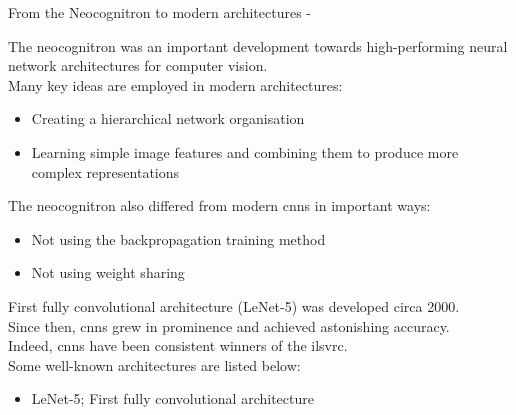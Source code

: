 %
%
%

\begin{frame}[t,allowframebreaks]{From the Neocognitron to modern architectures -}

    The \gls{neocognitron} 
    was an important development towards high-performing neural network
    architectures for computer vision.\\
    \vspace{0.2cm}
    Many key ideas are employed in modern architectures:    
    \begin{itemize}
        \item Creating a hierarchical network organisation
        \item Learning simple image features and combining them to produce more complex representations
    \end{itemize}
    \vspace{0.2cm}
    
    The \gls{neocognitron} 
    also differed from modern 
    \glspl{cnn}
    in important ways:
    \begin{itemize}
        \item Not using the backpropagation training method
        \item Not using weight sharing
    \end{itemize}

    \framebreak
    
    First fully convolutional architecture (\gls{LeNet-5}) was developed circa 2000.\\
    \vspace{0.2cm}
    Since then, \glspl{cnn}
    grew in prominence and achieved astonishing accuracy.\\
    \vspace{0.2cm}
    Indeed, \glspl{cnn} have been consistent winners
    of the \gls{ilsvrc}.\\ 
    \vspace{0.2cm}
    Some well-known architectures are listed below:\\

    \begin{itemize}

        \item 
        \gls{LeNet-5}\cite{LeCun:1998ln5};
        First fully convolutional architecture 


\end{itemize}
\end{frame}
